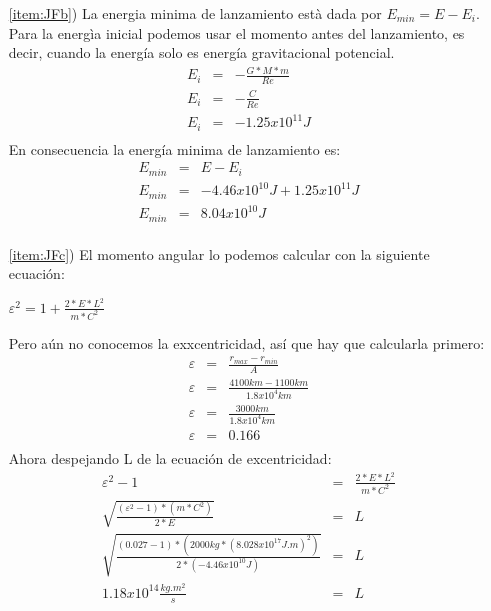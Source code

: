 \documentclass[12pt]{article}
\begin{document}
\begin{enumerate}
\begin{itemize}
  \item[\ref{item:JFb})] 
  La energia minima de lanzamiento està dada por $E_{min}=E-E_i$. Para la energìa inicial podemos usar el momento antes del lanzamiento, es decir, cuando la energía solo es energía gravitacional potencial.\\
 \begin{eqnarray}
 E_i&=&-\frac{G*M*m}{Re}\nonumber\\
 E_i&=&-\frac{C}{Re}\nonumber\\
 E_i&=&-1.25x10^{11} J\\
 \nonumber
 \end{eqnarray}
 En consecuencia la energía minima de lanzamiento es:\
 \begin{eqnarray}
 E_{min}&=&E-E_i\nonumber\\
 E_{min}&=&-4.46x10^{10} J + 1.25x10^{11} J\nonumber\\
 E_{min}&=&8.04x10^{10} J\\
 \nonumber
\end{eqnarray}
  
  
  
  \item[\ref{item:JFc})]
  El momento angular lo podemos calcular con la siguiente ecuación:\\
  \begin{center}
                                                $\varepsilon^2=1+\frac{2*E*L^2}{m*C^2}$\\
\end{center}
Pero aún no conocemos la exxcentricidad, así que hay que calcularla primero:\\
\begin{eqnarray}
\varepsilon&=&\frac{r_{max}-r_{min}}{A}\nonumber\\
\varepsilon&=&\frac{4100 km - 1100 km}{1.8x10^4 km}\nonumber\\
\varepsilon&=&\frac{3000 km}{1.8x10^4 km}\nonumber\\
\varepsilon&=&0.166\\
\nonumber
\end{eqnarray}
Ahora despejando L de la ecuación de excentricidad:\\
\begin{eqnarray}
\varepsilon^2-1&=&\frac{2*E*L^2}{m*C^2}\nonumber\\
\sqrt{\frac{(\varepsilon^2-1)*(m*C^2)}{2*E}}&=&L\nonumber\\
\sqrt{\frac{(0.027-1)*(2000 kg * (8.028x10^{17} J.m)^2)}{2*(-4.46x10^{10} J)}}&=&L\nonumber\\
1.18x10^{14} \frac{kg.m^2}{s}&=&L\\
\nonumber
\end{eqnarray} 


\end{itemize}
\end{enumerate}
\end{document}
